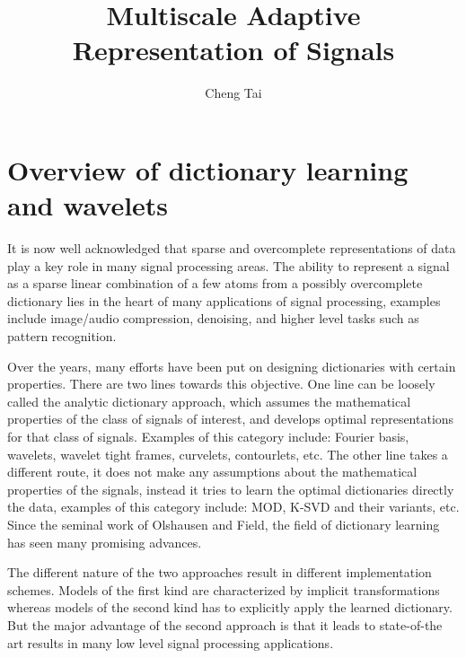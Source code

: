 \documentclass[a4paper]{article}
\begin{document}
\newtheorem{lem}{Lemma}
\newtheorem{prop}{Proposition}
\newtheorem{rem}{Remark}
\newtheorem{thm}{Theorem}
\renewcommand{\a}{\mathbf{a}}
\renewcommand{\v}{\mathbf{v}}
\title{Multiscale Adaptive Representation of Signals}
\author{Cheng Tai}
\date{}
\maketitle
\abstract{}
\section{Overview of dictionary learning and wavelets}
It is now well acknowledged that sparse and overcomplete representations of data play a key role in many signal processing areas. The ability to represent a signal as a sparse linear combination of a few atoms from a possibly overcomplete dictionary lies in the heart of many applications of signal processing, examples include image/audio compression, denoising, and higher level tasks such as pattern recognition.

Over the years, many efforts have been put on designing dictionaries with certain properties. There are two lines towards this objective.  One line can be loosely called the analytic dictionary approach, which assumes the mathematical properties of the class of signals of interest, and develops optimal representations for that class of signals. Examples of this category include: Fourier basis, wavelets, wavelet tight frames\cite{daubechies2003framelets}, curvelets\cite{candes2000curvelets}, contourlets\cite{do2002contourlets}, etc. The other line takes a different route, it does not make any assumptions about the mathematical properties of the signals, instead it tries to learn the optimal dictionaries directly the data, examples of this category include: MOD\cite{engan1999method}, K-SVD\cite{aharon2006svd} and their variants, etc. Since the seminal work of Olshausen and Field\cite{olshausen1996emergence}, the field of dictionary learning has seen many promising advances. 


The different nature of the two approaches result in different implementation schemes. Models of the first kind are characterized by implicit transformations whereas models of the second kind has to explicitly apply the learned dictionary. But the major advantage of the second approach is that it leads to state-of-the art results in many low level signal processing applications. 
\end{document}
